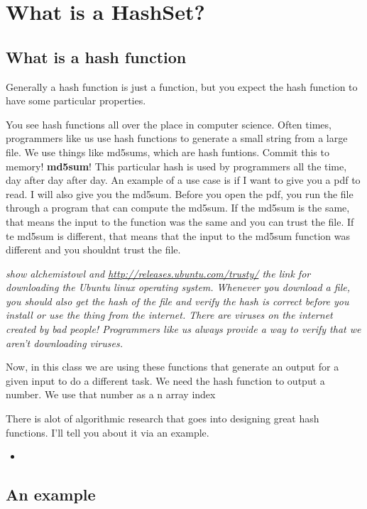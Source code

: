 \documentclass[12pt]{article}
\begin{document}
\section{What is a HashSet?}

\subsection{What is a hash function}
Generally a hash function is just a function, but you expect the hash function to have some particular properties. 

You see hash functions all over the place in computer science. Often times, programmers like us use hash functions to generate a small string from a large file. We use things like md5sums, which are hash funtions. Commit this to memory! \textbf{md5sum}! This particular hash is used by programmers all the time, day after day after day. An example of a use case is if I want to give you a pdf to read. I will also give you the md5sum. Before you open the pdf, you run the file through a program that can compute the md5sum. If the md5sum is the same, that means the input to the function was the same and you can trust the file. If te md5sum is different, that means that the input to the md5sum function was different and you shouldnt trust the file.

{\LARGE\textit{show alchemistowl and \url{http://releases.ubuntu.com/trusty/} the link for downloading the Ubuntu linux operating system. Whenever you download a file, you should also get the hash of the file and verify the hash is correct before you install or use the thing from the internet. There are viruses on the internet created by bad people! Programmers like us always provide a way to verify that we aren't downloading viruses.}}

Now, in this class we are using these functions that generate an output for a given input to do a different task. We need the hash function to output a number. We use that number as a n array index

There is alot of algorithmic research that goes into designing great hash functions. I'll tell you about it via an example. 

\begin{itemize}
\item
\end{itemize}


\subsection{An example}

\end{document}
